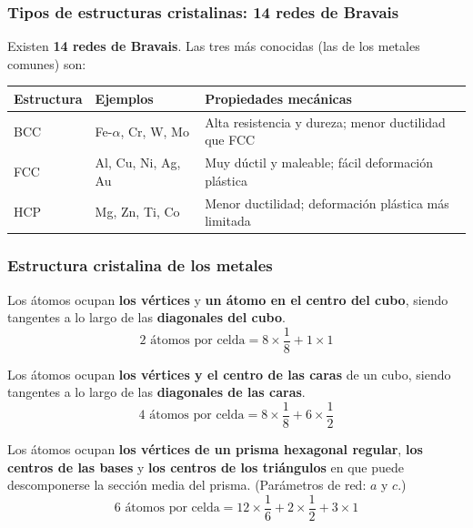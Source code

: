 \documentclass[12pt,a4paper]{article}
\begin{document}
\subsubsection{Tipos de estructuras cristalinas: 14 redes de Bravais}
Existen \textbf{14 redes de Bravais}. Las tres más conocidas (las de los metales
comunes) son:

\begin{center}
	\small
	\begin{tabularx}{\linewidth}{llX}
		\toprule
		\textbf{Estructura}    &
		\textbf{Ejemplos}      &
		\textbf{Propiedades mecánicas}
		\\
		\midrule
		BCC                    &
		Fe-$\alpha$, Cr, W, Mo &
		Alta resistencia y dureza; menor ductilidad que FCC
		\\
		FCC                    &
		Al, Cu, Ni, Ag, Au     &
		Muy dúctil y maleable; fácil deformación plástica
		\\
		HCP                    &
		Mg, Zn, Ti, Co         &
		Menor ductilidad; deformación plástica más limitada
		\\
		\bottomrule
	\end{tabularx}
\end{center}

\subsubsection{Estructura cristalina de los metales}

\begin{defi}
	Los átomos ocupan \textbf{los vértices} y \textbf{un átomo en el centro del
		cubo}, siendo tangentes a lo largo de las \textbf{diagonales del cubo}.
	$$2 \text{ átomos por celda} = 8 \times \dfrac{1}{8} + 1 \times 1$$
\end{defi}

\begin{defi}
	Los átomos ocupan \textbf{los vértices y el centro de las caras} de un cubo,
	siendo tangentes a lo largo de las \textbf{diagonales de las caras}.
	$$4 \text{ átomos por celda} = 8 \times \dfrac{1}{8} + 6 \times \dfrac{1}{2}$$
\end{defi}

\begin{defi}
	Los átomos ocupan \textbf{los vértices de un prisma hexagonal regular},
	\textbf{los centros de las bases} y \textbf{los centros de los triángulos} en
	que puede descomponerse la sección media del prisma. (Parámetros de red: $a$ y
	$c$.)
	$$6 \text{ átomos por celda} = 12 \times \dfrac{1}{6} + 2 \times \dfrac{1}{2}
		+
		3 \times 1$$
\end{defi}
\end{document}
